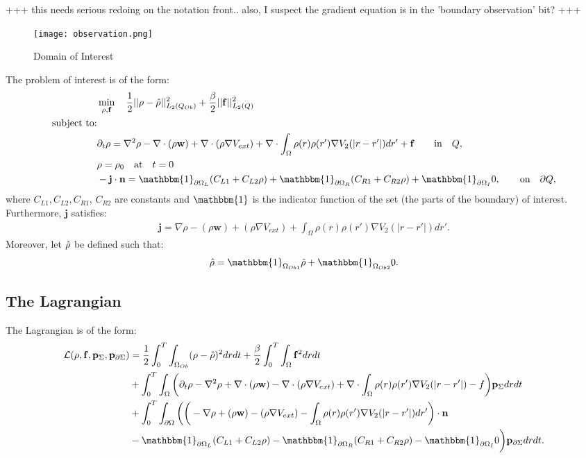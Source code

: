 +++ this needs serious redoing on the notation front.. also, I suspect the gradient equation is in the 'boundary observation' bit? +++

\begin{figure}[h]
	\texttt{[image: observation.png]}
	\caption{Domain of Interest}
	\label{Observation1}
\end{figure}

The problem of interest is of the form:
\begin{align*}
&\min_{\Sta, \Con} \quad \frac{1}{2}|| \Sta -\hat \Sta||^2_{L_2( Q_{Ob})} + \frac{\beta}{2}|| \Con||^2_{L_2(Q)}\\
\text{subject to:}\\
&\partial_t \rho = \nabla^2 \rho - \nabla \cdot (\rho \mathbf{w}) +\nabla \cdot (\rho \nabla V_{ext}) + \nabla \cdot \int_\Omega \rho(r) \rho(r') \nabla V_2(|r-r'|) dr' + \Con \quad  \quad\text{in} \quad Q,\notag\\
& \rho = \rho_0 \quad \text{at} \quad t=0 \notag\\
& - \mathbf{j} \cdot \nor = \mathbbm{1}_{\partial \Omega_L}( C_{L1}  + C_{L2}\Sta) +\mathbbm{1}_{\partial \Omega_R} ( C_{R1}  + C_{R2}\Sta) +\mathbbm{1}_{\partial \Omega_I} 0, \quad  \quad\text{on} \quad \partial Q, 
\end{align*}
where $C_{L1}, C_{L2}, C_{R1}$, $C_{R2}$ are constants and $\mathbbm{1}$ is the indicator function of the set (the parts of the boundary) of interest.
Furthermore, $\mathbf{j}$ satisfies:
\begin{align*}
\mathbf{j}=\nabla \rho - (\rho \mathbf{w}) +(\rho \nabla V_{ext}) +  \int_\Omega \rho(r) \rho(r') \nabla V_2(|r-r'|) dr'.
\end{align*}
Moreover, let $\hat {\rho}$ be defined such that:
\begin{align*}
\hat \Sta = \mathbbm{1}_{ \Omega_{Ob1}} \tilde \Sta  +\mathbbm{1}_{ \Omega_{Ob2}} 0.
\end{align*}

\subsection*{The Lagrangian}
The Lagrangian is of the form:
\begin{align*}
\mathcal{L}(\Sta,\Con,\Adja,\Adjc ) &=\frac{1}{2} \int_0^T \int_{\Omega_{Ob}} (\Sta - \hat \Sta)^2 dr dt + \frac{\beta}{2}\int_0^T \int_\Omega \Con^2 drdt \\
&+ \int_0^T \int_\Omega \bigg( \partial_t \rho - \nabla^2 \rho + \nabla \cdot (\rho \mathbf{w}) -\nabla \cdot (\rho \nabla V_{ext}) + \nabla \cdot \int_\Omega \rho(r) \rho(r') \nabla V_2(|r-r'|) -f \bigg) \Adja dr dt\\
&+ \int_0^T \int_{\partial \Omega} \bigg(  \bigg(-\nabla \rho+ (\rho \mathbf{w}) -(\rho \nabla V_{ext}) -  \int_\Omega \rho(r) \rho(r') \nabla V_2(|r-r'|) dr' \bigg)\cdot \nor\\
&  -\mathbbm{1}_{\partial \Omega_L}( C_{L1}  + C_{L2}\Sta) -\mathbbm{1}_{\partial \Omega_R} ( C_{R1}  + C_{R2}\Sta) -\mathbbm{1}_{\partial \Omega_I} 0 \bigg) \Adjc dr dt.
\end{align*}

